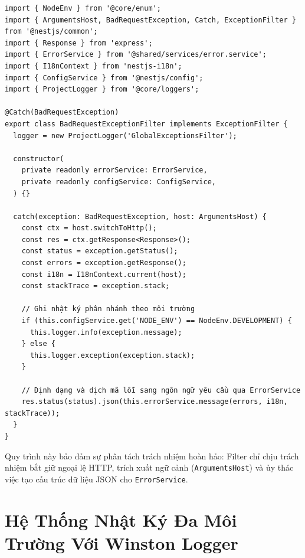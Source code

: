 \documentclass[12pt,a4paper,oneside]{book}
\begin{document}
\begin{codebox}
\begin{Verbatim}[fontsize=\small]
import { NodeEnv } from '@core/enum';
import { ArgumentsHost, BadRequestException, Catch, ExceptionFilter } from '@nestjs/common';
import { Response } from 'express';
import { ErrorService } from '@shared/services/error.service';
import { I18nContext } from 'nestjs-i18n';
import { ConfigService } from '@nestjs/config';
import { ProjectLogger } from '@core/loggers';

@Catch(BadRequestException)
export class BadRequestExceptionFilter implements ExceptionFilter {
  logger = new ProjectLogger('GlobalExceptionsFilter');

  constructor(
    private readonly errorService: ErrorService,
    private readonly configService: ConfigService,
  ) {}

  catch(exception: BadRequestException, host: ArgumentsHost) {
    const ctx = host.switchToHttp();
    const res = ctx.getResponse<Response>();
    const status = exception.getStatus();
    const errors = exception.getResponse();
    const i18n = I18nContext.current(host);
    const stackTrace = exception.stack;

    // Ghi nhật ký phân nhánh theo môi trường
    if (this.configService.get('NODE_ENV') == NodeEnv.DEVELOPMENT) {
      this.logger.info(exception.message);
    } else {
      this.logger.exception(exception.stack);
    }

    // Định dạng và dịch mã lỗi sang ngôn ngữ yêu cầu qua ErrorService
    res.status(status).json(this.errorService.message(errors, i18n, stackTrace));
  }
}
\end{Verbatim}
\end{codebox}

Quy trình này bảo đảm sự phân tách trách nhiệm hoàn hảo: Filter chỉ chịu trách nhiệm bắt giữ ngoại lệ HTTP, trích xuất ngữ cảnh (\texttt{ArgumentsHost}) và ủy thác việc tạo cấu trúc dữ liệu JSON cho \texttt{ErrorService}.

\chapter{Hệ Thống Nhật Ký Đa Môi Trường Với Winston Logger}
\end{document}

